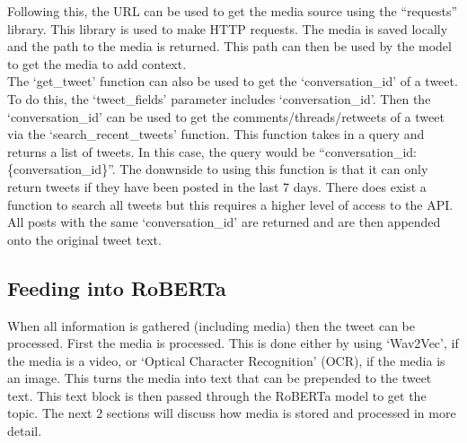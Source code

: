 Following this, the URL can be used to get the media source using the ``requests'' library. This library is used to make HTTP requests. The media is saved
locally and the path to the media is returned. This path can then be used by the model to get the media to add context.\\
The `get\_tweet' function can also be used to get the `conversation\_id' of a tweet. To do this, the `tweet\_fields' parameter includes `conversation\_id'.
Then the `conversation\_id' can be used to get the comments/threads/retweets of a tweet via the `search\_recent\_tweets' function. This function takes in
a query and returns a list of tweets. In this case, the query would be ``conversation\_id:\{conversation\_id\}''. The donwnside to using this function
is that it can only return tweets if they have been posted in the last 7 days. There does exist a function to search all tweets but this requires
a higher level of access to the API. All posts with the same `conversation\_id' are returned and are then appended onto the original tweet text.
\subsection{Feeding into RoBERTa}
When all information is gathered (including media) then the tweet can be processed. First the media is processed. This is done either by using
`Wav2Vec', if the media is a video, or `Optical Character Recognition' (OCR), if the media is an image. This turns the media into text that can be
prepended to the tweet text. This text block is then passed through the RoBERTa model to get the topic. The next 2 sections will discuss how
media is stored and processed in more detail.\\
